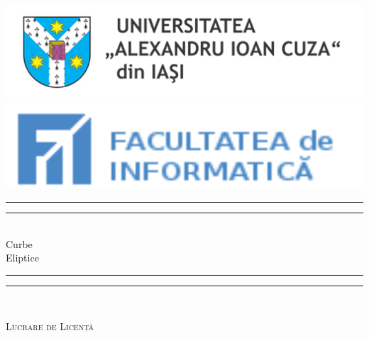 %
%
% 
%
%
\begin{titlingpage}
\begin{SingleSpace}
	\centering
	\includegraphics[scale=0.3]{frontmatter/LogoUAIC.png}
    \includegraphics[scale=0.5]{frontmatter/LogoFii.png}
	\vspace{1cm}
	{\scshape\Large  \par}
	\vspace{1.5cm}
    \vspace*{\baselineskip}
    \rule{\textwidth}{1.6pt}\vspace*{-\baselineskip}\vspace*{2pt}
    \rule{\textwidth}{0.4pt}\\[\baselineskip]
    {\LARGE Curbe \\[0.3\baselineskip] Eliptice}\\[0.2\baselineskip]
    \rule{\textwidth}{0.4pt}\vspace*{-\baselineskip}\vspace{3.2pt}
    \rule{\textwidth}{1.6pt}\\[\baselineskip]
    {\scshape\LARGE Lucrare de Licență\par}
    \vspace{7cm}
    

\end{SingleSpace}
\end{titlingpage}
